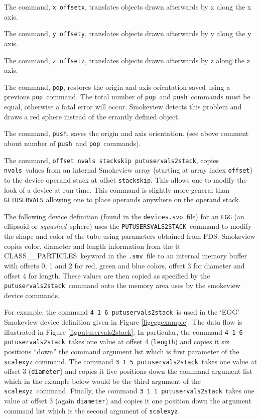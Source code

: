 \documentclass[11pt,twoside]{book}
\newcommand{\hitem}[1]{\item[{\bf #1} \hfill]}
\begin{document}
\hitem{OFFSETX} The command, {\tt x offsetx}, translates
objects drawn afterwards by x along the x axis.

\hitem{OFFSETY} The command, {\tt y offsety}, translates
objects drawn afterwards by y along the y axis.

\hitem{OFFSETZ} The command, {\tt z offsetz}, translates
objects drawn afterwards by z along the z axis.

\hitem{POP} The command, {\tt pop}, restores the origin and axis
orientation saved using a previous {\tt pop}\ command.  The total
number of {\tt pop}\ and {\tt push}\ commands must be equal,
otherwise a fatal error will occur.  Smokeview detects this
problem and draws a red sphere instead of the errantly defined
object.

\hitem{PUSH} The command, {\tt push}, saves the origin and axis
orientation. (see above comment about number of {\tt push}\ and
{\tt pop}\ commands).

\hitem{PUTUSERVALS2STACK} The command, {\tt offset nvals stackskip putuservals2stack}, copies {\tt nvals}\ values
from an internal Smokeview array (starting at array index {\tt offset})
to the device operand stack at offset {\tt stackskip}.  This allows one to modify
the look of a device at run-time. This command is slightly more general than {\tt GETUSERVALS} allowing one
to place operands anywhere on the operand stack.

The following device definition (found in the {\tt devices.svo}\ file) for an {\tt EGG} (an ellipsoid or {\em squashed}\ sphere) uses the {\tt PUTUSERSVALS2STACK}\
command to modify the shape and color of the tube using parameters obtained from FDS.  Smokeview copies color, diameter and length information from the {tt CLASS\_\_PARTICLES}\ keyword in the {\tt .smv}\ file to an internal memory buffer with offsets 0, 1 and 2 for red, green and blue colors, offset 3 for diameter and offset 4 for length.  These values are then copied as specified by the {\tt putuservals2stack}\ command onto the memory area uses by the smokeview device commands.

For example, the command {\tt 4 1 6 putuservals2stack}\ is used in the `EGG' Smokeview device definition given in Figure \ref{figeggexample}.  The data flow is illustrated in Figure \ref{figputuservals2stack}.  In particular,  the command {\tt 4 1 6 putuservals2stack}\ takes one value at offset 4 ({\tt length}) and copies it siz positions ``down'' the command argument list which is first parameter of the {\tt scalexyz} command.  The command
{\tt 3 1 5 putuservals2stack}\ takes one value at offset 3 ({\tt diameter}) and copies it five positions down the command argument list which in the example below would be the third argument of the {\tt scalexyz}\ command.  Finally, the command {\tt 3 1 1 putuservals2stack}\ takes one value at offset 3 (again {\tt diameter}) and copies it one position down the argument command list which is the second argument of {\tt scalexyz}.
\end{document}
